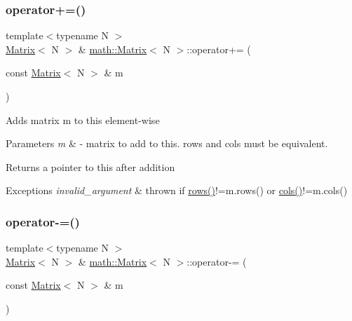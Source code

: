 \subsubsection{\texorpdfstring{operator+=()}{operator+=()}}
{\footnotesize\ttfamily template$<$typename N $>$ \\
\hyperlink{classmath_1_1Matrix}{Matrix}$<$ N $>$ \& \hyperlink{classmath_1_1Matrix}{math\+::\+Matrix}$<$ N $>$\+::operator+= (\begin{DoxyParamCaption}\item[{const \hyperlink{classmath_1_1Matrix}{Matrix}$<$ N $>$ \&}]{m }\end{DoxyParamCaption})}

Adds matrix {\ttfamily m} to {\ttfamily this} element-\/wise 
\begin{DoxyParams}{Parameters}
{\em m} & -\/ matrix to add to {\ttfamily this}. rows and cols must be equivalent. \\
\hline
\end{DoxyParams}
\begin{DoxyReturn}{Returns}
a pointer to {\ttfamily this} after addition 
\end{DoxyReturn}

\begin{DoxyExceptions}{Exceptions}
{\em invalid\+\_\+argument} & thrown if {\ttfamily \hyperlink{classmath_1_1Matrix_a602173645d806afe305ed77b1ff38273}{rows()}!=m.\+rows()} or {\ttfamily \hyperlink{classmath_1_1Matrix_ad78b49e12a607856df124a18a855aaf1}{cols()}!=m.\+cols()} \\
\hline
\end{DoxyExceptions}
\mbox{\label{classmath_1_1Matrix_a046b9f4717da34fb08795cb461497084}} 
\subsubsection{\texorpdfstring{operator-\/=()}{operator-=()}}
{\footnotesize\ttfamily template$<$typename N $>$ \\
\hyperlink{classmath_1_1Matrix}{Matrix}$<$ N $>$ \& \hyperlink{classmath_1_1Matrix}{math\+::\+Matrix}$<$ N $>$\+::operator-\/= (\begin{DoxyParamCaption}\item[{const \hyperlink{classmath_1_1Matrix}{Matrix}$<$ N $>$ \&}]{m }\end{DoxyParamCaption})}

